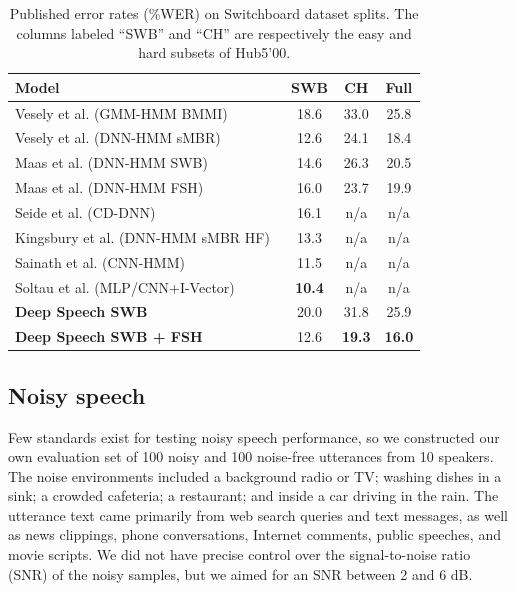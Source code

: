 \documentclass{article}
\begin{document}
\begin{table}[ht!]
\centering
\begin{tabular}{l  c  c  c }
\toprule
Model & SWB & CH & Full \\
\midrule
Vesely et al. (GMM-HMM BMMI)~\cite{Povey2013}   & 18.6 & 33.0 & 25.8 \\
Vesely et al. (DNN-HMM sMBR)~\cite{Povey2013}    & 12.6 & 24.1  & 18.4 \\
Maas et al. (DNN-HMM SWB)~\cite{maas2014largeam}  & 14.6 & 26.3  & 20.5 \\
Maas et al. (DNN-HMM FSH)~\cite{maas2014largeam}  & 16.0 & 23.7  & 19.9 \\
Seide et al. (CD-DNN)~\cite{seide2011}     & 16.1 & n/a & n/a \\
Kingsbury et al. (DNN-HMM sMBR HF)~\cite{Kingsbury2012}  & 13.3 & n/a & n/a \\
Sainath et al. (CNN-HMM)~\cite{sainath2013cnn} & 11.5 & n/a & n/a \\
Soltau et al. (MLP/CNN+I-Vector)~\cite{soltau2014cnn} & {\bf 10.4 } & n/a & n/a \\
{\bf Deep Speech SWB} & 20.0 & 31.8 & 25.9 \\
{\bf Deep Speech SWB + FSH} & 12.6 & {\bf 19.3} & {\bf 16.0} \\
\bottomrule
\end{tabular}
\caption{Published error rates (\%WER) on Switchboard dataset splits. The columns labeled ``SWB'' and ``CH'' are respectively the easy and hard subsets of Hub5'00.}
\label{table:hub5}
\end{table}

\subsection{Noisy speech}
\label{section:expnoise}

Few standards exist for testing noisy speech performance, so we constructed our
own evaluation set of 100 noisy and 100 noise-free utterances from 10 speakers.
The noise environments included a background radio or TV; washing dishes in a
sink; a crowded cafeteria; a restaurant; and inside a car driving in the rain.
The utterance text came primarily from web search queries and text messages, as
well as news clippings, phone conversations, Internet comments, public
speeches, and movie scripts. We did not have precise control over the
signal-to-noise ratio (SNR) of the noisy samples, but we aimed for an SNR
between 2 and 6 dB. 
\end{document}
